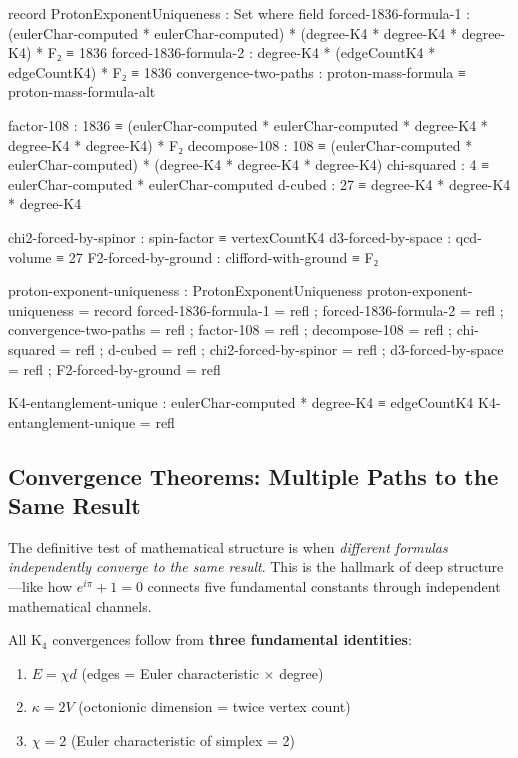 \documentclass[11pt,a4paper]{book}
\begin{document}
\begin{code}
record ProtonExponentUniqueness : Set where
  field
    forced-1836-formula-1   : (eulerChar-computed * eulerChar-computed) * (degree-K4 * degree-K4 * degree-K4) * F₂ ≡ 1836
    forced-1836-formula-2   : degree-K4 * (edgeCountK4 * edgeCountK4) * F₂ ≡ 1836
    convergence-two-paths   : proton-mass-formula ≡ proton-mass-formula-alt
    
    factor-108 : 1836 ≡ (eulerChar-computed * eulerChar-computed * degree-K4 * degree-K4 * degree-K4) * F₂
    decompose-108 : 108 ≡ (eulerChar-computed * eulerChar-computed) * (degree-K4 * degree-K4 * degree-K4)
    chi-squared : 4 ≡ eulerChar-computed * eulerChar-computed
    d-cubed : 27 ≡ degree-K4 * degree-K4 * degree-K4
    
    chi2-forced-by-spinor : spin-factor ≡ vertexCountK4
    d3-forced-by-space : qcd-volume ≡ 27
    F2-forced-by-ground : clifford-with-ground ≡ F₂

proton-exponent-uniqueness : ProtonExponentUniqueness
proton-exponent-uniqueness = record
  { forced-1836-formula-1 = refl
  ; forced-1836-formula-2 = refl
  ; convergence-two-paths = refl
  ; factor-108 = refl
  ; decompose-108 = refl
  ; chi-squared = refl
  ; d-cubed = refl
  ; chi2-forced-by-spinor = refl
  ; d3-forced-by-space = refl
  ; F2-forced-by-ground = refl
  }
\end{code}

\begin{code}
K4-entanglement-unique : eulerChar-computed * degree-K4 ≡ edgeCountK4
K4-entanglement-unique = refl
\end{code}

\subsection{Convergence Theorems: Multiple Paths to the Same Result}
\label{sec:convergence-theorems}

The definitive test of mathematical structure is when 
\emph{different formulas independently converge to the same result}. This is the 
hallmark of deep structure---like how $e^{i\pi} + 1 = 0$ connects 
five fundamental constants through independent mathematical channels.

All K$_4$ convergences follow from \textbf{three fundamental identities}:
\begin{enumerate}
\item $E = \chi d$ (edges = Euler characteristic $\times$ degree)
\item $\kappa = 2V$ (octonionic dimension = twice vertex count)
\item $\chi = 2$ (Euler characteristic of simplex = 2)
\end{enumerate}
\end{document}
